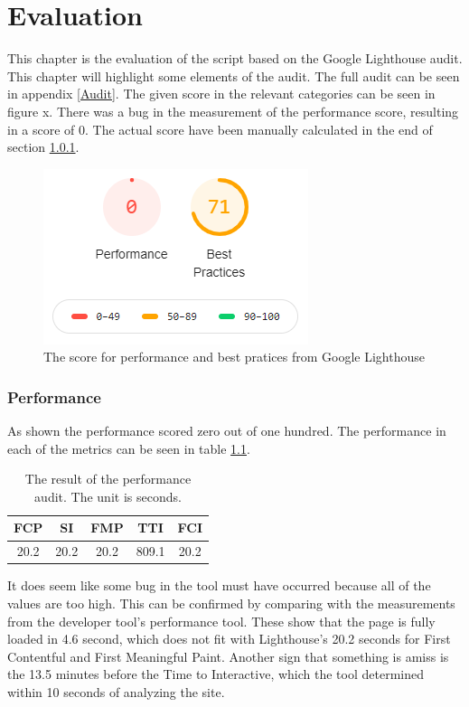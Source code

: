 \chapter{Evaluation}\label{Eval}
This chapter is the evaluation of the script based on the Google Lighthouse audit. This chapter will highlight some elements of the audit. The full audit can be seen in appendix \ref{Audit}. The given score in the relevant categories can be seen in figure x. There was a bug in the measurement of the performance score, resulting in a score of 0. The actual score have been manually calculated in the end of section \ref{EvalPerform}. 

\begin{figure} [H]
	\centering
	\includegraphics[width=.4\textwidth]{Pictures/LighthouseGrade}
	\caption{The score for performance and best pratices from Google Lighthouse}
	\label{LighthouseGrade}
\end{figure}

\subsection{Performance}\label{EvalPerform}
As shown the performance scored zero out of one hundred. The performance in each of the metrics can be seen in table \ref{PerformanceAuditValues}.

\begin{table}[htbp]
	\centering
	\begin{tabular}{|c|c|c|c|c|}
		\hline 
		FCP & SI & FMP & TTI & FCI \\ 
		\hline 
		20.2 & 20.2 & 20.2 & 809.1 & 20.2 \\ 
		\hline 
	\end{tabular} 
	\caption{The result of the performance audit. The unit is seconds.}
	\label{PerformanceAuditValues}
\end{table}

It does seem like some bug in the tool must have occurred because all of the values are too high. This can be confirmed by comparing with the measurements from the developer tool’s performance tool. These show that the page is fully loaded in 4.6 second, which does not fit with Lighthouse’s 20.2 seconds for First Contentful and First Meaningful Paint. Another sign that something is amiss is the 13.5 minutes before the Time to Interactive, which the tool determined within 10 seconds of analyzing the site. 

